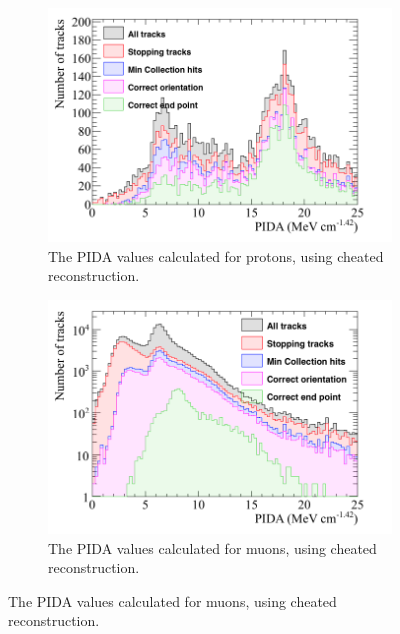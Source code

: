 \begin{figure}
\begin{subfigure}{0.48\textwidth}
  \end{subfigure}
  \begin{subfigure}{0.48\textwidth}
        \centering
        \includegraphics[width=\textwidth]{ProtonEnrich_500V_v05_14_00_trackpmtrackdc_Proton_PIDA}
        \caption{The PIDA values calculated for protons, using cheated reconstruction.}
        \label{fig:CRY_PIDA_Proton_Cheat}
  \end{subfigure}%
  \hspace{0.03\textwidth}%
  \begin{subfigure}{0.48\textwidth}
        \centering
        \includegraphics[width=\textwidth]{ProtonEnrich_500V_v05_14_00_trackpmtrackdc_Muon_PIDA}
        \caption{The PIDA values calculated for muons, using cheated reconstruction.}
        \label{fig:CRY_PIDA_Muon_Cheat}
  \end{subfigure}

\end{figure}

